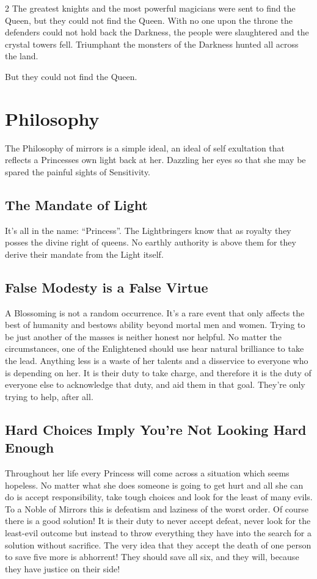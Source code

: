 \begin{multicols}{2}
The greatest knights and the most powerful magicians were sent to find the Queen, but they could not find the Queen. With no one upon the throne the defenders could not hold back the Darkness, the people were slaughtered and the crystal towers fell. Triumphant the monsters of the Darkness hunted all across the land. 

But they could not find the Queen. 

\section*{Philosophy}

The Philosophy of mirrors is a simple ideal, an ideal of self exultation that reflects a Princesses own light back at her. Dazzling her eyes so that she may be spared the painful sights of Sensitivity.

\subsection*{The Mandate of Light}

It's all in the name: \textquotedblleft Princess\textquotedblright. The Lightbringers know that as royalty they posses the divine right of queens. No earthly authority is above them for they derive their mandate from the Light itself. 

\subsection*{False Modesty is a False Virtue}

A Blossoming is not a random occurrence. It's a rare event that only affects the best of humanity and bestows ability beyond mortal men and women. Trying to be just another of the masses is neither honest nor helpful. No matter the circumstances, one of the Enlightened should use hear natural brilliance to take the lead. Anything less is a waste of her talents and a disservice to everyone who is depending on her. It is their duty to take charge, and therefore it is the duty of everyone else to acknowledge that duty, and aid them in that goal. They're only trying to help, after all. 

\subsection*{Hard Choices Imply You're Not Looking Hard Enough}

Throughout her life every Princess will come across a situation which seems hopeless. No matter what she does someone is going to get hurt and all she can do is accept responsibility, take tough choices and look for the least of many evils. To a Noble of Mirrors this is defeatism and laziness of the worst order. Of course there is a good solution! It is their duty to never accept defeat, never look for the least-evil outcome but instead to throw everything they have into the search for a solution without sacrifice. The very idea that they accept the death of one person to save five more is abhorrent! They should save all six, and they will, because they have justice on their side! 


\end{multicols}
